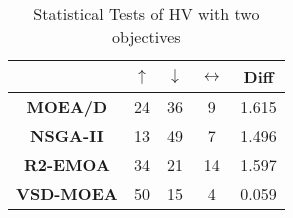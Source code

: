 
\begin{table}[t]
\centering
\caption{Statistical Tests of HV with two objectives}
\label{tab:Tests_HV_2obj}

\begin{tabular}{c c|c|c|c}
\cline{2-5}
                                        & \textbf{$\uparrow$} & \textbf{$\downarrow$} & \textbf{$\leftrightarrow$} & \textbf{Diff} \\ \hline
\multicolumn{1}{c|}{\textbf{MOEA/D}}   & 24                  & 36                    & 9                          & 1.615         \\ \hline
\multicolumn{1}{c|}{\textbf{NSGA-II}}  & 13                  & 49                    & 7                          & 1.496         \\ \hline
\multicolumn{1}{c|}{\textbf{R2-EMOA}}  & 34                  & 21                    & 14                         & 1.597         \\ \hline
\multicolumn{1}{c|}{\textbf{VSD-MOEA}} & 50                  & 15                    & 4                          & 0.059         \\ \hline
\end{tabular}%
\end{table}


%


